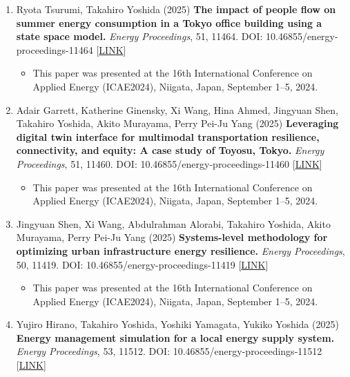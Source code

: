 \documentclass[
]{book}
\providecommand{\tightlist}{%
  \setlength{\itemsep}{0pt}\setlength{\parskip}{0pt}}
\begin{document}
\begin{enumerate}
  \begin{itemize}
  \tightlist
  \item
    This paper was presented at the Applied Energy Symposium and Forum: Low carbon cities and urban energy systems (CUE2025), Kitakyushu, Japan, July 18--22, 2025.
  \end{itemize}
\item
  Ryota Tsurumi, Takahiro Yoshida (2025)
  \textbf{The impact of people flow on summer energy consumption in a Tokyo office building using a state space model.}
  \emph{Energy Proceedings}, 51, 11464.
  DOI: 10.46855/energy-proceedings-11464 {[}\href{https://doi.org/10.46855/energy-proceedings-11464}{LINK}{]}

  \begin{itemize}
  \tightlist
  \item
    This paper was presented at the 16th International Conference on Applied Energy (ICAE2024), Niigata, Japan, September 1--5, 2024.
  \end{itemize}
\item
  Adair Garrett, Katherine Ginensky, Xi Wang, Hina Ahmed, Jingyuan Shen, Takahiro Yoshida, Akito Murayama, Perry Pei-Ju Yang (2025)
  \textbf{Leveraging digital twin interface for multimodal transportation resilience, connectivity, and equity: A case study of Toyosu, Tokyo.}
  \emph{Energy Proceedings}, 51, 11460.
  DOI: 10.46855/energy-proceedings-11460 {[}\href{https://doi.org/10.46855/energy-proceedings-11460}{LINK}{]}

  \begin{itemize}
  \tightlist
  \item
    This paper was presented at the 16th International Conference on Applied Energy (ICAE2024), Niigata, Japan, September 1--5, 2024.
  \end{itemize}
\item
  Jingyuan Shen, Xi Wang, Abdulrahman Alorabi, Takahiro Yoshida, Akito Murayama, Perry Pei-Ju Yang (2025)
  \textbf{Systems-level methodology for optimizing urban infrastructure energy resilience.}
  \emph{Energy Proceedings}, 50, 11419.
  DOI: 10.46855/energy-proceedings-11419 {[}\href{https://doi.org/10.46855/energy-proceedings-11419}{LINK}{]}

  \begin{itemize}
  \tightlist
  \item
    This paper was presented at the 16th International Conference on Applied Energy (ICAE2024), Niigata, Japan, September 1--5, 2024.
  \end{itemize}
\item
  Yujiro Hirano, Takahiro Yoshida, Yoshiki Yamagata, Yukiko Yoshida (2025)
  \textbf{Energy management simulation for a local energy supply system.}
  \emph{Energy Proceedings}, 53, 11512.
  DOI: 10.46855/energy-proceedings-11512 {[}\href{https://doi.org/10.46855/energy-proceedings-11512}{LINK}{]}


\end{enumerate}
\end{document}
